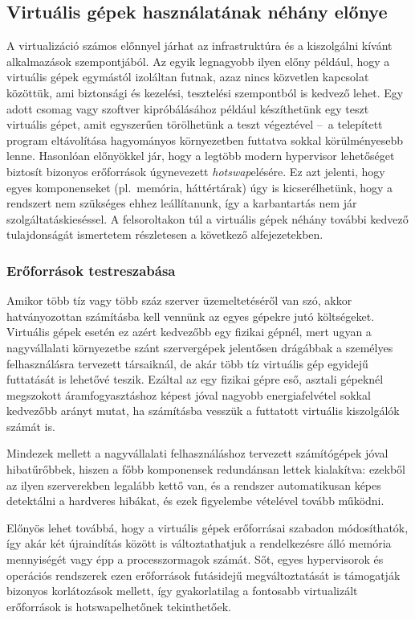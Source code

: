 \subsection{Virtuális gépek használatának néhány előnye}
A virtualizáció számos előnnyel járhat az infrastruktúra és a kiszolgálni kívánt alkalmazások szempontjából. Az egyik legnagyobb ilyen előny például, hogy a virtuális gépek egymástól izoláltan futnak, azaz nincs közvetlen kapcsolat közöttük, ami biztonsági és kezelési, tesztelési szempontból is kedvező lehet. Egy adott csomag vagy szoftver kipróbálásához például készíthetünk egy teszt virtuális gépet, amit egyszerűen törölhetünk a teszt végeztével --~a telepített program eltávolítása hagyományos környezetben futtatva sokkal körülményesebb lenne. Hasonlóan előnyökkel jár, hogy a legtöbb modern \gls{hypervisor} lehetőséget biztosít bizonyos erőforrások úgynevezett \textit{\gls{hotswap}}elésére. Ez azt jelenti, hogy egyes komponenseket (pl.~memória, háttértárak) úgy is kicserélhetünk, hogy a rendszert nem szükséges ehhez leállítanunk, így a karbantartás nem jár szolgáltatáskieséssel. A felsoroltakon túl a virtuális gépek néhány további kedvező tulajdonságát ismertetem részletesen a következő alfejezetekben.

\subsubsection{Erőforrások testreszabása}
Amikor több tíz vagy több száz szerver üzemeltetéséről van szó, akkor hatványozottan számításba kell vennünk az egyes gépekre jutó költségeket. Virtuális gépek esetén ez azért kedvezőbb egy fizikai gépnél, mert ugyan a nagyvállalati környezetbe szánt szervergépek jelentősen drágábbak a személyes felhasználásra tervezett társaiknál, de akár több tíz virtuális gép egyidejű futtatását is lehetővé teszik. Ezáltal az egy fizikai gépre eső, asztali gépeknél megszokott áramfogyasztáshoz képest jóval nagyobb energiafelvétel sokkal kedvezőbb arányt mutat, ha számításba vesszük a futtatott virtuális kiszolgálók számát is.

Mindezek mellett a nagyvállalati felhasználáshoz tervezett számítógépek jóval hibatűrőbbek, hiszen a főbb komponensek redundánsan lettek kialakítva: ezekből az ilyen szerverekben legalább kettő van, és a rendszer automatikusan képes detektálni a hardveres hibákat, és ezek figyelembe vételével tovább működni.

Előnyös lehet továbbá, hogy a virtuális gépek erőforrásai szabadon módosíthatók, így akár két újraindítás között is változtathatjuk a rendelkezésre álló memória mennyiségét vagy épp a processzormagok számát. Sőt, egyes \gls{hypervisor}ok és operációs rendszerek ezen erőforrások futásidejű megváltoztatását is támogatják bizonyos korlátozások mellett, így gyakorlatilag a fontosabb virtualizált erőforrások is \gls{hotswap}elhetőnek tekinthetőek.

